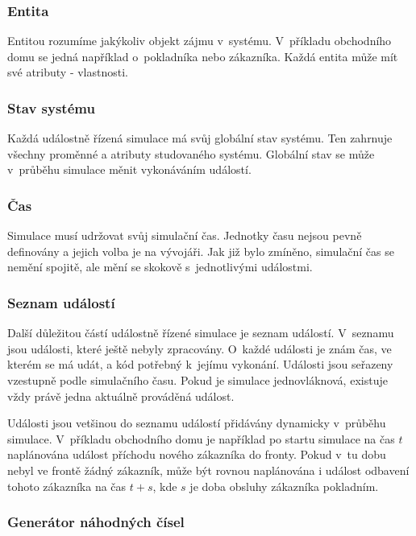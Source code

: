 \subsubsection{Entita}

Entitou rozumíme jakýkoliv objekt zájmu v~systému. V~příkladu obchodního domu se jedná například o~pokladníka nebo zákazníka. Každá entita může mít své atributy - vlastnosti.

\subsubsection{Stav systému}

Každá událostně řízená simulace má svůj globální stav systému. Ten zahrnuje všechny proměnné a atributy studovaného systému. Globální stav se může v~průběhu
simulace měnit vykonáváním událostí.

\subsubsection{Čas}

Simulace musí udržovat svůj simulační čas. Jednotky času nejsou pevně definovány a jejich volba je na vývojáři. Jak již bylo zmíněno, simulační čas se nemění spojitě, ale mění se skokově s~jednotlivými událostmi.

\subsubsection{Seznam událostí}

Další důležitou částí událostně řízené simulace je seznam událostí. V~seznamu jsou události, které ještě nebyly zpracovány. O~každé události je znám čas, ve kterém se má udát, a kód potřebný k~jejímu vykonání. Události jsou seřazeny vzestupně podle simulačního času. Pokud je simulace jednovláknová, existuje vždy právě jedna aktuálně prováděná událost.

Události jsou vetšinou do seznamu událostí přidávány dynamicky v~průběhu simulace. V~příkladu obchodního domu je například po startu simulace na čas $t$ naplánována událost příchodu nového zákazníka do fronty. Pokud v~tu dobu nebyl ve frontě žádný zákazník, může být rovnou naplánována i událost odbavení tohoto zákazníka na čas $t+s$, kde $s$ je doba obsluhy zákazníka pokladním.

\subsubsection{Generátor náhodných čísel}

